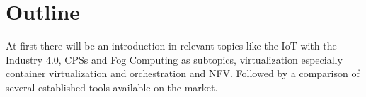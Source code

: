 \doit


\section{Outline}
At first there will be an introduction in relevant topics like the \ac{IoT} with the Industry 4.0, \acp{CPS} and Fog Computing as subtopics, virtualization especially container virtualization and orchestration and \ac{NFV}.
Followed by a comparison of several established tools available on the market.

\doit
